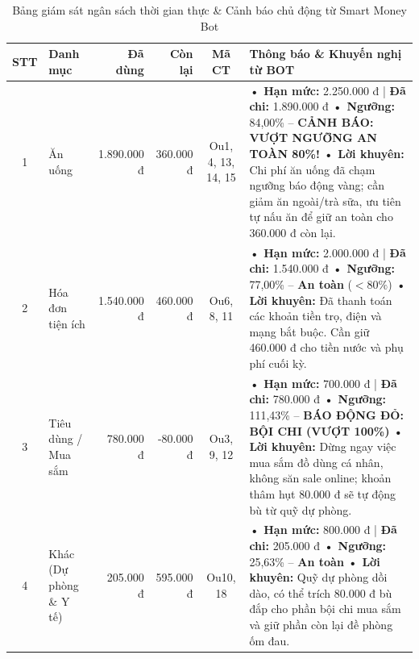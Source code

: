 \documentclass[11pt, a4paper]{article}
\begin{document}
\begin{table}[htbp]
\centering
\caption{Bảng giám sát ngân sách thời gian thực \& Cảnh báo chủ động từ Smart Money Bot}
\vspace{0.5em}
\scriptsize
\begin{tabularx}{\textwidth}{c p{2cm} r r c X}
\toprule
\rowcolor{tableheader}
\textbf{STT} & \textbf{Danh mục} & \textbf{Đã dùng} & \textbf{Còn lại} & \textbf{Mã CT} & \textbf{Thông báo \& Khuyến nghị từ BOT} \\
\midrule
1 & Ăn uống & 1.890.000 đ & 360.000 đ & Ou1, 4, 13, 14, 15 & 
\textbf{• Hạn mức:} 2.250.000 đ | \textbf{Đã chi:} 1.890.000 đ\newline
\textbf{• Ngưỡng:} 84,00\% -- \textcolor{warning}{\textbf{CẢNH BÁO: VƯỢT NGƯỠNG AN TOÀN 80\%!}}\newline
\textbf{• Lời khuyên:} Chi phí ăn uống đã chạm ngưỡng báo động vàng; cần giảm ăn ngoài/trà sữa, ưu tiên tự nấu ăn để giữ an toàn cho 360.000 đ còn lại. \\
\hline

2 & Hóa đơn tiện ích & 1.540.000 đ & 460.000 đ & Ou6, 8, 11 & 
\textbf{• Hạn mức:} 2.000.000 đ | \textbf{Đã chi:} 1.540.000 đ\newline
\textbf{• Ngưỡng:} 77,00\% -- \textbf{An toàn} ($< 80\%$)\newline
\textbf{• Lời khuyên:} Đã thanh toán các khoản tiền trọ, điện và mạng bắt buộc. Cần giữ 460.000 đ cho tiền nước và phụ phí cuối kỳ. \\
\hline

3 & Tiêu dùng / Mua sắm & 780.000 đ & -80.000 đ & Ou3, 9, 12 & 
\textbf{• Hạn mức:} 700.000 đ | \textbf{Đã chi:} 780.000 đ\newline
\textbf{• Ngưỡng:} 111,43\% -- \textcolor{danger}{\textbf{BÁO ĐỘNG ĐỎ: BỘI CHI (VƯỢT 100\%)}}\newline
\textbf{• Lời khuyên:} Dừng ngay việc mua sắm đồ dùng cá nhân, không săn sale online; khoản thâm hụt 80.000 đ sẽ tự động bù từ quỹ dự phòng. \\
\hline

4 & Khác (Dự phòng \& Y tế) & 205.000 đ & 595.000 đ & Ou10, 18 & 
\textbf{• Hạn mức:} 800.000 đ | \textbf{Đã chi:} 205.000 đ\newline
\textbf{• Ngưỡng:} 25,63\% -- \textbf{An toàn}\newline
\textbf{• Lời khuyên:} Quỹ dự phòng dồi dào, có thể trích 80.000 đ bù đắp cho phần bội chi mua sắm và giữ phần còn lại đề phòng ốm đau. \\
\hline


\end{tabularx}
\end{table}
\end{document}
